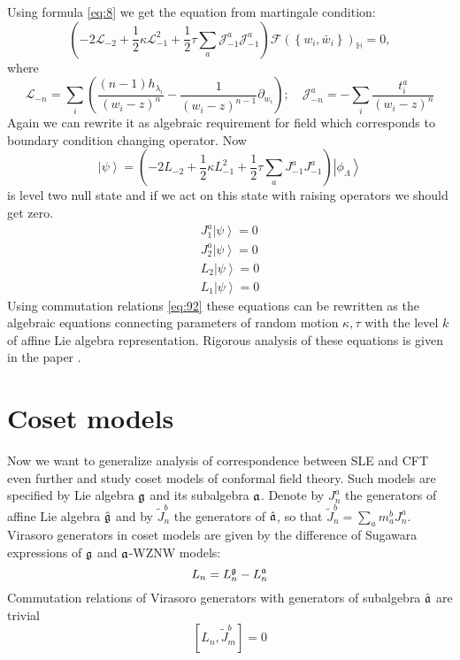 Using formula \eqref{eq:8} we get the equation from martingale condition:
\begin{equation}
  \left(-2 \mathcal{L}_{-2}+\frac{1}{2}\kappa \mathcal{L}_{-1}^{2}+\frac{1}{2}\tau\sum_{a} \mathcal{J}^{a}_{-1} \mathcal{J}^{a}_{-1}\right)        \mathcal{F}(\left\{w_{i}, \bar w_{i}\right\})_{\mathbb{H}}=0,
  \label{eq:27}
\end{equation}
where
\begin{equation*}
  \mathcal{L}_{-n}=\sum_{i}\left(\frac{(n-1)h_{\lambda_{i}}}{(w_{i}-z)^{n}}-\frac{1}{(w_{i}-z)^{n-1}}\partial_{w_{i}}\right);\quad \mathcal{J}^{a}_{{-n}}=-\sum_{i}\frac{t^{a}_{i}}{(w_{i}-z)^{n}}
\end{equation*}
Again we can rewrite it as algebraic requirement for  field  which corresponds to boundary condition changing operator. Now
\begin{equation}
  \left| \psi\right>=\left(-2 L_{-2}+\frac{1}{2}\kappa L_{-1}^{2}+\frac{1}{2}\tau\sum_{a} J^{a}_{-1} J^{a}_{-1}\right) \left|\phi_{\Lambda}\right>    
  \label{eq:16}
\end{equation}
is level two null state and if we act on this state with raising operators we should get zero.
\begin{eqnarray}
  J^{a}_{1} \left|\psi\right>=0\\
  J^{a}_{2}\left|\psi\right>=0\\
  L_{2}\left|\psi\right>=0\\
  L_{1}\left|\psi\right>=0
\end{eqnarray}
Using commutation relations \eqref{eq:92} these equations can be rewritten as the algebraic equations connecting parameters of random motion $\kappa, \tau$ with the level $k$ of affine Lie algebra representation. Rigorous analysis of these equations is given in the paper \cite{alekseev2010sle}.

\section{Coset models}
\label{sec:coset-models}
Now we want to generalize analysis of correspondence between SLE and CFT even further and study coset models of conformal field theory\cite{Goddard198588}. Such models are specified by  Lie algebra $\mathfrak{g}$ and its subalgebra $\mathfrak{a}$. Denote by $J_{n}^{a}$ the generators of affine Lie algebra $\hat{\mathfrak{g}}$ and by $\tilde{J}_{n}^{b}$ the generators of $\hat{\mathfrak{a}}$, so that $\tilde{J}^{b}_{n}=\sum_{a} m_{a}^{b} J^{a}_{n}$.
Virasoro generators in coset models are given by the difference of Sugawara expressions of $\mathfrak{g}$ and $\mathfrak{a}$-WZNW models:
\begin{equation*}
  L_{n}=L_{n}^{\mathfrak{g}}-L_{n}^{\mathfrak{a}}
\end{equation*}
Commutation relations of Virasoro generators with generators of subalgebra $\hat{\mathfrak{a}}$ are trivial
\begin{equation}
  \label{eq:26}
  \left[L_{n},\tilde{J}^{b}_{m}\right]=0
\end{equation}

